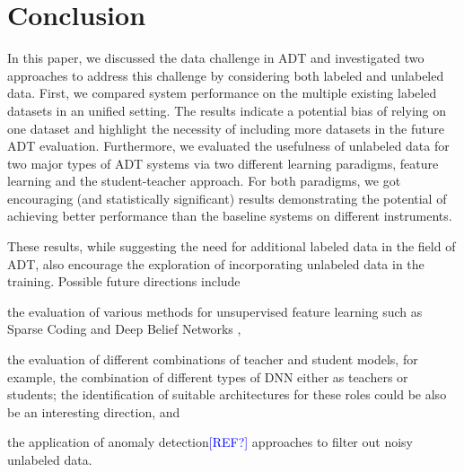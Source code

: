 \documentclass{article}
\newcommand{\comment}[1]{{\textcolor{blue}{#1}}}
\begin{document}
\section{Conclusion}
\label{sec:conc}

In this paper, we discussed the data challenge in ADT and investigated two approaches to address this challenge by considering both labeled and unlabeled data. First, we compared system performance on the multiple existing labeled datasets in an unified setting. The results indicate a potential bias of relying on one dataset and highlight the necessity of including more datasets in the future ADT evaluation. Furthermore, we evaluated the usefulness of unlabeled data for two major types of ADT systems via two different learning paradigms, feature learning and the student-teacher approach. For both paradigms, we got encouraging (and statistically significant) results demonstrating the potential of achieving better performance than the baseline systems on different instruments.

These results, while suggesting the need for additional labeled data in the field of ADT, also encourage the exploration of incorporating unlabeled data in the training. 
Possible future directions include
\begin{inparaenum}[(i)]
	\item the evaluation of various methods for unsupervised feature learning such as Sparse Coding \cite{Raina2007a} and Deep Belief Networks \cite{Hamel2010},
    \item the evaluation of different combinations of teacher and student models, for example, the combination of different types of DNN either as teachers or students; the identification of suitable architectures for these roles could be also be an interesting direction, and
    \item the application of anomaly detection\comment{[REF?]} approaches to filter out noisy unlabeled data.   
\end{inparaenum} 



%
%
%
%
\end{document}
